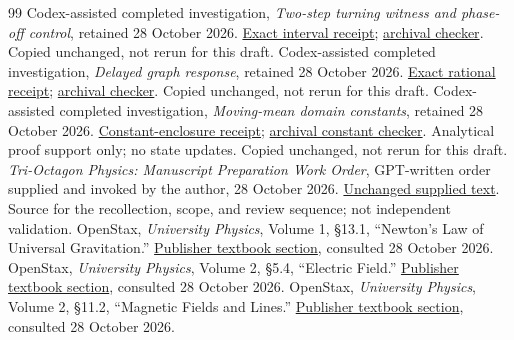 \begin{thebibliography}{99}
 Codex-assisted completed investigation, \emph{Two-step turning witness and phase-off control}, retained 28 October 2026. \href{evidence/turning_witness_20261028.json}{Exact interval receipt}; \href{evidence/turning_witness_20261028.py}{archival checker}. Copied unchanged, not rerun for this draft.
 Codex-assisted completed investigation, \emph{Delayed graph response}, retained 28 October 2026. \href{evidence/delayed_graph_response_20261028.json}{Exact rational receipt}; \href{evidence/delayed_graph_response_20261028.py}{archival checker}. Copied unchanged, not rerun for this draft.
 Codex-assisted completed investigation, \emph{Moving-mean domain constants}, retained 28 October 2026. \href{evidence/moving_mean_domain_constants_20261028.json}{Constant-enclosure receipt}; \href{evidence/moving_mean_domain_constants_20261028.py}{archival constant checker}. Analytical proof support only; no state updates. Copied unchanged, not rerun for this draft.
 \emph{Tri-Octagon Physics: Manuscript Preparation Work Order}, GPT-written order supplied and invoked by the author, 28 October 2026. \href{evidence/MANUSCRIPT_WORK_ORDER.txt}{Unchanged supplied text}. Source for the recollection, scope, and review sequence; not independent validation.
 OpenStax, \emph{University Physics}, Volume 1, \S13.1, ``Newton's Law of Universal Gravitation.'' \href{https://openstax.org/books/university-physics-volume-1/pages/13-1-newtons-law-of-universal-gravitation}{Publisher textbook section}, consulted 28 October 2026.
 OpenStax, \emph{University Physics}, Volume 2, \S5.4, ``Electric Field.'' \href{https://openstax.org/books/university-physics-volume-2/pages/5-4-electric-field}{Publisher textbook section}, consulted 28 October 2026.
 OpenStax, \emph{University Physics}, Volume 2, \S11.2, ``Magnetic Fields and Lines.'' \href{https://openstax.org/books/university-physics-volume-2/pages/11-2-magnetic-fields-and-lines}{Publisher textbook section}, consulted 28 October 2026.
\end{thebibliography}
